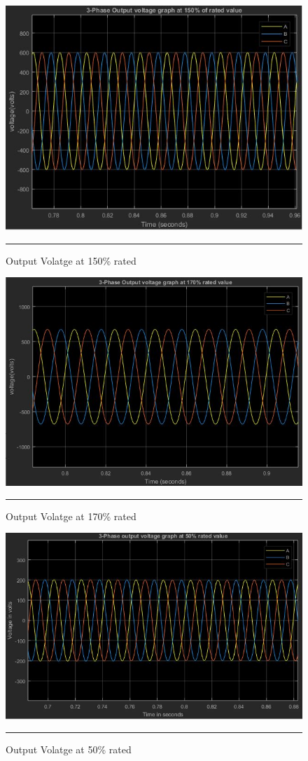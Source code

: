 \begin{figure}[htbp]
	\centering
	\includegraphics[width = 6in]{./Figures/150.JPG}
	\rule{35em}{1pt}
	\caption{Output Volatge at 150\% rated}
\end{figure}
\begin{figure}[htbp]
	\centering
	\includegraphics[width = 6in]{./Figures/170.JPG}
	\rule{35em}{1pt}
	\caption{Output Volatge at 170\% rated}
\end{figure}
\begin{figure}[htbp]
	\centering
	\includegraphics[width = 6in]{./Figures/50.JPG}
	\rule{35em}{1pt}
	\caption{Output Volatge at 50\% rated}
\end{figure}
\newpage
